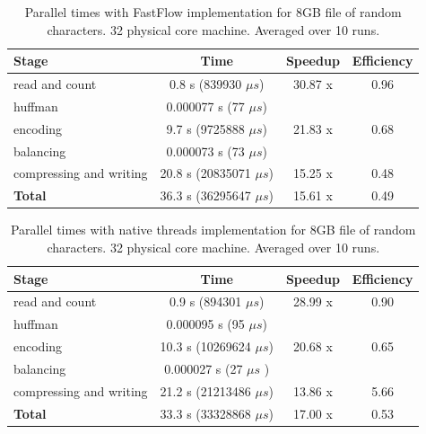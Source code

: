 \documentclass[12pt, letterpaper]{article}
\begin{document}
\begin{table}[h]
\begin{center}
\begin{tabular}{l c c c}
    \textbf{Stage} & \textbf{Time} & \textbf{Speedup} & \textbf{Efficiency} \\
    \hline
    read and count & 0.8 s (839930 $\mu s$) & 30.87 x & 0.96 \\
    \hline
    huffman & 0.000077 s (77 $\mu s$)  &  \\
    \hline
    encoding & 9.7 s (9725888 $\mu s$)  &  21.83 x & 0.68 \\
    \hline
    balancing & 0.000073 s (73 $\mu s$)  &\\
    \hline
    compressing and writing &  20.8 s (20835071 $\mu s$)  & 15.25 x & 0.48 \\
    \hline
    \textbf{Total} & 36.3 s (36295647 $\mu s$)   & 15.61 x & 0.49 \\ 
\end{tabular}
\caption{Parallel times with FastFlow implementation for 8GB file of random characters. 32 physical core machine. Averaged over 10 runs.}
\label{tab:ff_times}
\end{center}
\end{table}


\begin{table}[h]
\begin{center}
\begin{tabular}{l c c c}
    \textbf{Stage} & \textbf{Time} & \textbf{Speedup} & \textbf{Efficiency}  \\
    \hline
    read and count & 0.9 s (894301 $\mu s$)  & 28.99 x & 0.90  \\
    \hline
    huffman & 0.000095 s (95 $\mu s$) & \\
    \hline
    encoding & 10.3 s (10269624 $\mu s$)  & 20.68 x & 0.65 \\
    \hline
    balancing & 0.000027 s (27 $\mu s$ ) & \\
    \hline
    compressing and writing & 21.2 s (21213486 $\mu s$)  & 13.86 x & 5.66\\
    \hline
    \textbf{Total} & 33.3 s (33328868 $\mu s$)  & 17.00 x & 0.53 \\ 
\end{tabular}
\caption{Parallel times with native threads implementation for 8GB file of random characters. 32 physical core machine. Averaged over 10 runs.}    
\label{tab:thr_times}
\end{center}
\end{table}
\end{document}
